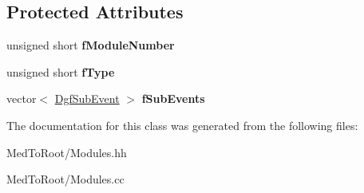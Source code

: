 \subsection*{Protected Attributes}
\begin{DoxyCompactItemize}
\item 
\hypertarget{class_dgf_module_a06f12e7fd7e2353c454d91884fcf2bbd}{unsigned short {\bfseries f\-Module\-Number}}\label{class_dgf_module_a06f12e7fd7e2353c454d91884fcf2bbd}

\item 
\hypertarget{class_dgf_module_a126da76a1c1329ce3f896371d0ba7ca1}{unsigned short {\bfseries f\-Type}}\label{class_dgf_module_a126da76a1c1329ce3f896371d0ba7ca1}

\item 
\hypertarget{class_dgf_module_a0f969bc0853fa696d9ecf93ad1156f27}{vector$<$ \hyperlink{class_dgf_sub_event}{Dgf\-Sub\-Event} $>$ {\bfseries f\-Sub\-Events}}\label{class_dgf_module_a0f969bc0853fa696d9ecf93ad1156f27}

\end{DoxyCompactItemize}


The documentation for this class was generated from the following files\-:\begin{DoxyCompactItemize}
\item 
Med\-To\-Root/Modules.\-hh\item 
Med\-To\-Root/Modules.\-cc\end{DoxyCompactItemize}
